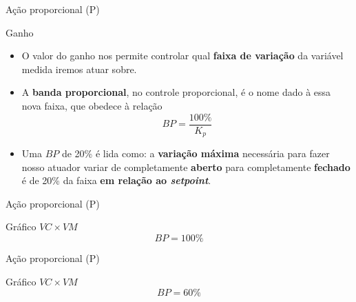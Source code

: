 \begin{frame}{Ação proporcional (P)}
	\begin{block}{Ganho}
		\begin{itemize}
			\item O valor do ganho nos permite controlar qual \textbf{faixa de variação} da variável medida iremos atuar sobre.
			\item A \textbf{banda proporcional}, no controle proporcional, é o nome dado à essa nova faixa, que obedece à relação\[ BP=\dfrac{100\%}{K_p} \]
			\item Uma $ BP $ de 20\% é lida como: a \textbf{variação máxima} necessária para fazer nosso atuador variar de completamente \textbf{aberto} para completamente \textbf{fechado} é de 20\% da faixa \textbf{em relação ao \textit{setpoint}}.
		\end{itemize}
	\end{block}
\end{frame}


\begin{frame}{Ação proporcional (P)}
	\begin{block}{Gráfico $ VC \times VM $}
		\[ BP=100\% \]
	\end{block}

\medskip

\centering

\end{frame}


\begin{frame}{Ação proporcional (P)}
	\begin{block}{Gráfico $ VC \times VM $}
		\[ BP=60\% \]
	\end{block}
	
	\medskip
	
	\centering
	
\end{frame}


